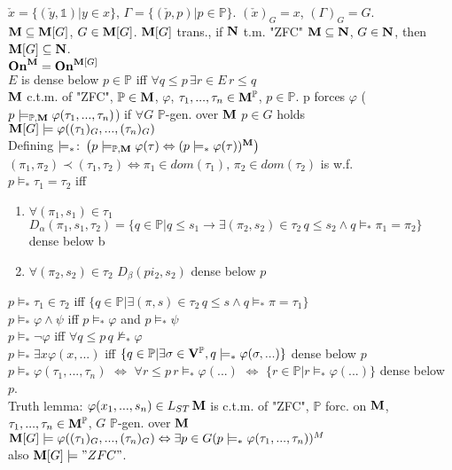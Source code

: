 \documentclass[9pt]{article}
\newcommand{\class}[1]{{\bf #1}}
\newcommand{\Pp}{\mathbb{P}}
\newcommand{\On}{\class{On}}
\newcommand{\V}{\class{V}}
\begin{document}
\begin{multicols*}{2}
$\check{x}=\{(\check{y},\mathbb{1})|y\in x\}$, $\Gamma=\{(\check{p},p)|p\in\Pp\}$. $(\check{x})_G=x$, $(\Gamma)_G=G$.\\
$\class{M}\subseteq\class{M}[G]$, $G\in\class{M}[G]$. $\class{M}[G]$ trans., if $\class{N}$ t.m. "ZFC" $
\class{M}\subseteq\class{N}$, $G\in\class{N}$, then $\class{M}[G]\subseteq \class{N}$.\\
$\On^\class{M}=\On^{\class{M}[G]}$\\
$E$ is dense below $p\in\Pp$ iff $\forall q\leqslant p\,\exists r\in E\,r\leqslant q$\\
$\class{M}$ c.t.m. of "ZFC", $\Pp\in\class{M}$, $\varphi$, $\tau_1,...,\tau_n\in\class{M}^\Pp$, $p\in\Pp$. p forces $\varphi$ ($p\models_{\Pp,\class{M}}\varphi(\tau_1,...,\tau_n)$) if $\forall G$ $\Pp$-gen. over $\class{M}$ $p\in G$ holds $\class{M}[G]\models\varphi((\tau_1)_G,...,(\tau_n)_G)$\\
Defining $\models_*\colon \left(p\models_{\Pp,\class{M}}\varphi(\tau)\Leftrightarrow (p\models_*\varphi(\tau))^\class{M}\right)$\\
$(\pi_1,\pi_2)\prec (\tau_1,\tau_2)\Leftrightarrow \pi_1\in dom(\tau_1),\,\pi_2\in dom(\tau_2)$ is w.f.\\
$p\models_*\tau_1=\tau_2$ iff\begin{enumerate}
	\item $\forall (\pi_1,s_1)\in\tau_1$ $D_\alpha(\pi_1,s_1,\tau_2)=\{q\in\Pp|q\leqslant s_1\to \exists(\pi_2,s_2)\in\tau_2\,q\leqslant s_2\wedge q\models_*\pi_1=\pi_2\}$ dense below b
	\item $\forall(\pi_2,s_2)\in\tau_2$ $D_\beta(pi_2,s_2)$ dense below $p$
\end{enumerate}
$p\models_*\tau_1\in\tau_2$ iff $\{q\in \Pp|\exists (\pi,s)\in\tau_2\,q\leqslant s\wedge q\models_* \pi=\tau_1\}$\\
$p\models_*\varphi\wedge\psi$ iff $p\models_*\varphi$ and $p\models_*\psi$\\
$p\models_*\neg\varphi$ iff $\forall q\leqslant p\,q\not\models_*\varphi$\\
$p\models_*\exists x\varphi(x,...)$ iff $\{q\in \Pp|\exists \sigma\in\V^\Pp,q\models_*\varphi(\sigma,...)\}$ dense below $p$\\
$p\models_*\varphi(\tau_1,...,\tau_n)$ $\Leftrightarrow$ $\forall r\leqslant p\,r\models_*\varphi(...)$ $\Leftrightarrow$ $\{r\in\Pp|r\models_*\varphi(...)\}$ dense below $p$.\\
Truth lemma: $\varphi(x_1,...,s_n)\in L_{ST}\,\class{M}$ is c.t.m. of "ZFC", $\Pp$ forc. on $\class{M}$, $\tau_1,...,\tau_n\in\class{M}^\Pp$, $G$ $\Pp$-gen. over $\class{M}$ $\class{M}[G]\models \varphi((\tau_1)_G,...,(\tau_n)_G)\Leftrightarrow\exists p\in G(p\models_*\varphi(\tau_1,...,\tau_n))^M$\\
also $\class{M}[G]\models "ZFC"$.


\end{multicols*}
\end{document}
